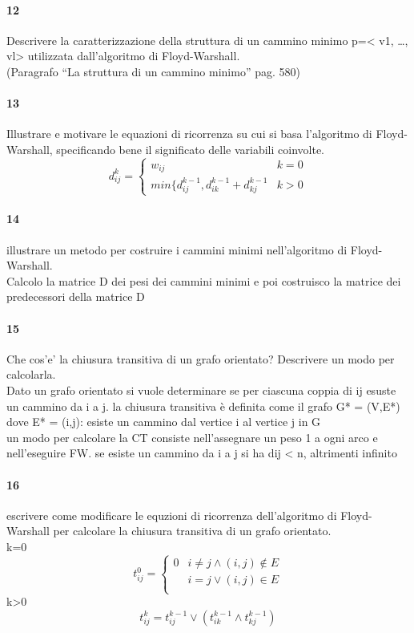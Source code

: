 \documentclass[12pt, a4paper, openany]{book}
\begin{document}
\paragraph{12}
Descrivere la caratterizzazione della struttura di un cammino minimo p=< v1,
…, vl> utilizzata dall’algoritmo di Floyd-Warshall.\\
(Paragrafo “La struttura di un cammino minimo” pag. 580)\\
\paragraph{13}
Illustrare e motivare le equazioni di ricorrenza su cui si basa l’algoritmo di
Floyd-Warshall, specificando bene il significato delle variabili coinvolte.
\begin{equation*}
    d_{ij}^k = \begin{cases}
        w_{ij}                                        & k=0 \\
        min\{d_{ij}^{k-1},d_{ik}^{k-1} + d_{kj}^{k-1} & k>0
    \end{cases}
\end{equation*}
\paragraph{14}
illustrare un metodo per costruire i cammini minimi nell’algoritmo di Floyd-Warshall.\\
Calcolo la matrice D dei pesi dei cammini minimi e poi costruisco la matrice dei predecessori della matrice D
\paragraph{15}
Che cos’e’ la chiusura transitiva di un grafo orientato? Descrivere un modo
per calcolarla.\\
Dato un grafo orientato si vuole determinare se per ciascuna coppia di ij esuste un cammino da i a j. la chiusura transitiva è definita come il grafo G* = (V,E*) dove E* = {(i,j): esiste un cammino dal vertice i al vertice j in G}\\
un modo per calcolare la CT consiste nell'assegnare un peso 1 a ogni arco e nell'eseguire FW. se esiste un cammino da i a j si ha dij < n, altrimenti infinito
\paragraph{16}
escrivere come modificare le equzioni di ricorrenza dell’algoritmo di Floyd-Warshall per calcolare la chiusura transitiva di un grafo orientato.\\
k=0
\begin{equation*}
    t_{ij}^0 = \begin{cases}
        0  & i \neq j \land (i,j) \notin E \\
        \  & i = j \lor (i,j) \in E        \\
    \end{cases}
\end{equation*}
k>0
\begin{equation*}
    t_{ij}^k = t_{ij}^{k-1} \lor (t_{ik}^{k-1} \land t_{kj}^{k-1})
\end{equation*}
\end{document}
